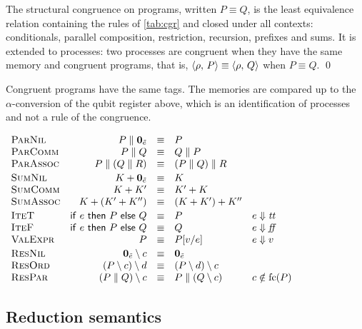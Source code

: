 \begin{definition}\label{def:cgr-prog}
The structural congruence on programs, written $P \equiv Q$, is the least
equivalence relation containing the rules of \cref{tab:cgr} and closed under
all contexts: conditionals, parallel composition, restriction, recursion,
prefixes and sums. It is extended to processes: two processes are congruent
when they have the same memory and congruent programs, that is,
$\langle \rho ,\, P \rangle \equiv \langle \rho ,\, Q \rangle$ when $P \equiv Q$.
\qed
\end{definition}

Congruent programs have the same tags. The memories are compared up to the $\alpha$-conversion of the qubit register
above, which is an identification of processes and not a rule of the
congruence.

\begin{table}[ht]
\centering
\small
$\begin{array}{l@{\quad}rcl@{\quad}l}
\textsc{ParNil} & P \parallel \mathbf{0}_{\tilde e} &\equiv& P \\
\textsc{ParComm} & P \parallel Q &\equiv& Q \parallel P \\
\textsc{ParAssoc} & P \parallel (Q \parallel R) &\equiv& (P \parallel Q) \parallel R \\[2pt]
\textsc{SumNil} & K + \mathbf{0}_{\tilde e} &\equiv& K \\
\textsc{SumComm} & K + K' &\equiv& K' + K \\
\textsc{SumAssoc} & K + (K' + K'') &\equiv& (K + K') + K'' \\[2pt]
\textsc{IteT} & \ite{e}{P}{Q} &\equiv& P & e \Downarrow \mathit{tt} \\
\textsc{IteF} & \ite{e}{P}{Q} &\equiv& Q & e \Downarrow \mathit{ff} \\
\textsc{ValExpr} & P &\equiv& P[v/e] & e \Downarrow v \\[2pt]
\textsc{ResNil} & \mathbf{0}_{\tilde e} \setminus c &\equiv& \mathbf{0}_{\tilde e} \\
\textsc{ResOrd} & (P \setminus c) \setminus d &\equiv& (P \setminus d) \setminus c \\
\textsc{ResPar} & (P \parallel Q) \setminus c &\equiv& P \parallel (Q \setminus c) & c \notin \fc(P)
\end{array}$
\caption{Structural congruence of \lqCCS.}
\label{tab:cgr}
\end{table}

\subsection{Reduction semantics}

